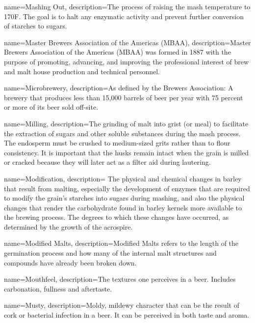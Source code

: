 {
  name={Mashing Out},
  description={The process of raising the mash temperature to 170F. The goal is to halt any enzymatic activity and prevent further conversion of starches to sugars.}
  }

{
  name={Master Brewers Association of the Americas (MBAA)},
  description={Master Brewers Association of the Americas (MBAA) was formed in 1887 with the purpose of promoting, advancing, and improving the professional interest of brew and malt house production and technical personnel.}
  }

{
  name={Microbrewery},
  description={As defined by the Brewers Association: A brewery that produces less than 15,000 barrels of beer per year with 75 percent or more of its beer sold off-site.}
  }

{
  name={Milling},
  description={The grinding of malt into grist (or meal) to facilitate the extraction of sugars and other soluble substances during the mash process. The endosperm must be crushed to medium-sized grits rather than to flour consistency. It is important that the husks remain intact when the grain is milled or cracked because they will later act as a filter aid during lautering.}
  }

{
  name={Modification},
  description={ The physical and chemical changes in barley that result from malting, especially the development of enzymes that are required to modify the grain’s starches into sugars during mashing, and also the physical changes that render the carbohydrate found in barley kernels more available to the brewing process.  The degrees to which these changes have occurred, as determined by the growth of the acrospire.}
  }

{
  name={Modified Malts},
  description={Modified Malts refers to the length of the germination process and how many of the internal malt structures and compounds have already been broken down.}
  }

{
  name={Mouthfeel},
  description={The textures one perceives in a beer. Includes carbonation, fullness and aftertaste.}
  }

{
  name={Musty},
  description={Moldy, mildewy character that can be the result of cork or bacterial infection in a beer. It can be perceived in both taste and aroma.}
  }

